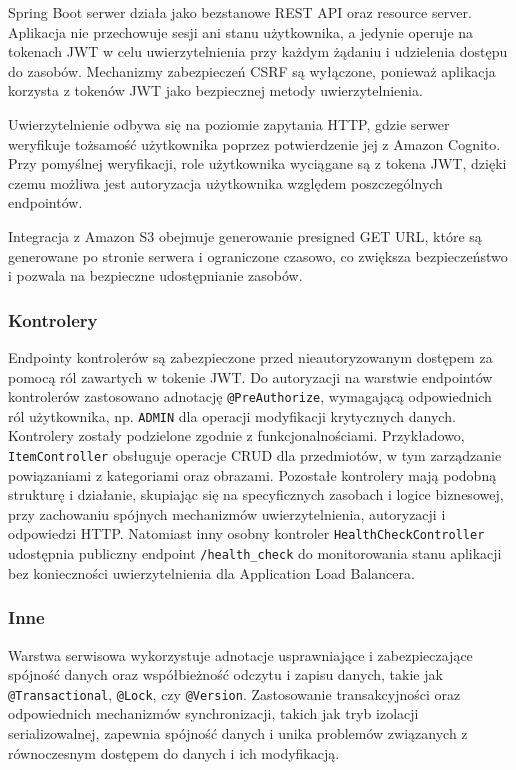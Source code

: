 \documentclass[../../main.tex]{subfiles}
\begin{document}
    Spring Boot serwer działa jako bezstanowe REST API oraz resource server.
    Aplikacja nie przechowuje sesji ani stanu użytkownika, a jedynie operuje na tokenach JWT w celu uwierzytelnienia przy każdym żądaniu i udzielenia dostępu do zasobów.
    Mechanizmy zabezpieczeń CSRF są wyłączone, ponieważ aplikacja korzysta z tokenów JWT jako bezpiecznej metody uwierzytelnienia.

    Uwierzytelnienie odbywa się na poziomie zapytania HTTP, gdzie serwer weryfikuje tożsamość użytkownika poprzez potwierdzenie jej z Amazon Cognito.
    Przy pomyślnej weryfikacji, role użytkownika wyciągane są z tokena JWT, dzięki czemu możliwa jest autoryzacja użytkownika względem poszczególnych endpointów.

    Integracja z Amazon S3 obejmuje generowanie presigned GET URL, które są generowane po stronie serwera i ograniczone czasowo, co zwiększa bezpieczeństwo i pozwala na bezpieczne udostępnianie zasobów.

    \subsubsection{Kontrolery}
    Endpointy kontrolerów są zabezpieczone przed nieautoryzowanym dostępem za pomocą ról zawartych w tokenie JWT.
    Do autoryzacji na warstwie endpointów kontrolerów zastosowano adnotację \texttt{@PreAuthorize}, wymagającą odpowiednich ról użytkownika, np. \texttt{ADMIN} dla operacji modyfikacji krytycznych danych.
    Kontrolery zostały podzielone zgodnie z funkcjonalnościami. Przykładowo, \texttt{ItemController} obsługuje operacje CRUD dla przedmiotów, w tym zarządzanie powiązaniami z kategoriami oraz obrazami.
    Pozostałe kontrolery mają podobną strukturę i działanie, skupiając się na specyficznych zasobach i logice biznesowej, przy zachowaniu spójnych mechanizmów uwierzytelnienia, autoryzacji i odpowiedzi HTTP.
    Natomiast inny osobny kontroler \texttt{HealthCheckController} udostępnia publiczny endpoint \texttt{/health\_check} do monitorowania stanu aplikacji bez konieczności uwierzytelnienia dla Application Load Balancera.

    \subsubsection{Inne}
    Warstwa serwisowa wykorzystuje adnotacje usprawniające i zabezpieczające spójność danych oraz współbieżność odczytu i zapisu danych, takie jak \texttt{@Transactional}, \texttt{@Lock}, czy \texttt{@Version}.
    Zastosowanie transakcyjności oraz odpowiednich mechanizmów synchronizacji, takich jak tryb izolacji serializowalnej, zapewnia spójność danych i unika problemów związanych z równoczesnym dostępem do danych i ich modyfikacją.
\end{document}
